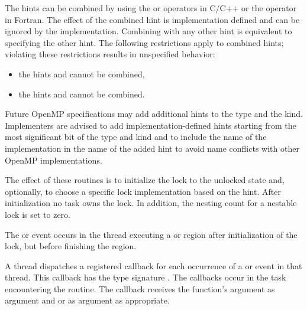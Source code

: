 The hints can be combined by using the \code{+} or \code{|} operators in C/C++ or the \code{+} operator in Fortran.  
The effect of the combined hint is implementation defined and can be ignored by the implementation.
Combining  with any other hint is equivalent to specifying the other hint.
The following restrictions apply to combined hints; violating these 
restrictions results in unspecified behavior:
\begin{itemize}
\item the hints  and  cannot be combined,
\item the hints  and  cannot be combined.
\end{itemize}


\begin{note}
Future OpenMP specifications may add additional hints to the 
 type and the  kind.  
Implementers are advised to add implementation-defined hints starting from 
the most significant bit of the  type and
 kind and to include the name of the 
implementation in the name of the added hint to avoid name conflicts 
with other OpenMP implementations.
\end{note}


\effect
The effect of these routines is to initialize the lock to the unlocked state and, optionally, to choose a specific lock implementation based on the hint. 
After initialization no task owns the lock. In addition, the nesting count for a nestable lock is set to zero.

\events

The  or  event occurs in the thread 
executing a  or  region
after initialization of the lock, but before finishing the region.

\tools

A thread dispatches a registered 
callback for each occurrence of a  or  event 
in that thread.  This callback has the type signature .
The callbacks occur in the task encountering the routine. 
The callback receives the function's  argument as
 argument and
 or 
  as  argument as appropriate.


